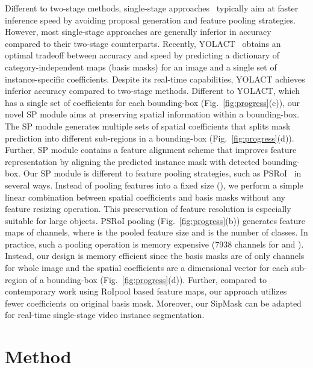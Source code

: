 \documentclass[runningheads]{llncs}
\begin{document}
Different to two-stage methods, single-stage approaches~\cite{Bolya_YOLACT_ICCV_2019,Dai_InstanceFCN_ECCV_2016,Xu_ESE_ICCV_2019,Wang_RDSNet_AAAI_2020} typically aim at faster inference speed by avoiding proposal generation and feature pooling strategies. However, most single-stage approaches are generally inferior in accuracy compared to their two-stage counterparts. Recently, YOLACT~\cite{Bolya_YOLACT_ICCV_2019} obtains an optimal tradeoff between accuracy and speed by predicting a dictionary of category-independent maps (basis masks) for an image and a single set of instance-specific coefficients. Despite its real-time capabilities, YOLACT achieves inferior accuracy compared to two-stage methods.  Different to YOLACT, which has a single set of coefficients for each bounding-box (Fig.~\ref{fig:progress}(c)), our novel SP module aims at preserving spatial information within a bounding-box. The SP module generates multiple sets of spatial coefficients that splits mask prediction into different sub-regions in a bounding-box (Fig.~\ref{fig:progress}(d)). Further, SP module contains a feature alignment scheme that improves feature representation by aligning the predicted instance mask with detected bounding-box. Our SP module is different to feature pooling strategies, such as PSRoI~\cite{Li_FCIS_CVPR_2017} in several ways. Instead of pooling features into a fixed size (), we perform a simple linear combination between spatial coefficients and basis masks without any feature resizing operation. This preservation of feature resolution is especially suitable for large objects. PSRoI pooling (Fig.~\ref{fig:progress}(b)) generates feature maps of  channels, where  is the pooled feature size and  is the number of classes. In practice, such a pooling operation is memory expensive (7938 channels for  and ). Instead, our design is memory efficient since the basis masks are of only  channels for whole image and the spatial coefficients are a  dimensional vector for each sub-region of a bounding-box (Fig.~\ref{fig:progress}(d)). Further, compared to contemporary work \cite{Chen_BlendMask_CVPR_2020} using RoIpool based feature maps, our approach utilizes fewer coefficients on original basis mask. Moreover, our SipMask can be adapted for real-time single-stage video instance segmentation.

\section{Method}
\end{document}
